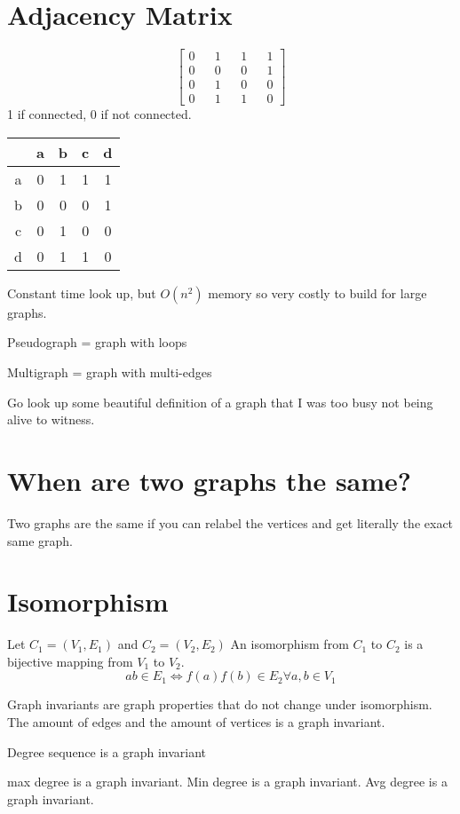 \documentclass{report}
\begin{document}
\section{Adjacency Matrix}
\[
\begin{bmatrix}
0 && 1 && 1 && 1 \\
0 && 0 && 0 && 1 \\
0 && 1 && 0 && 0 \\
0 && 1 && 1 && 0 
\end{bmatrix}
\]
1 if connected, 0 if not connected.

\begin{center}
\begin{tabular}{ c | c | c | c | c }
   & a & b & c & d \\ \hline
a & 0 & 1 & 1 & 1 \\ \hline
b & 0 & 0 & 0 & 1 \\ \hline
c & 0 & 1 & 0 & 0 \\ \hline
d & 0 & 1 & 1 & 0 
\end{tabular}
\end{center}

Constant time look up, but $O(n^2)$ memory so very costly to build for large graphs.


Pseudograph = graph with loops

Multigraph = graph with multi-edges


Go look up some beautiful definition of a graph that I was too busy not being alive to witness.

\section{When are two graphs the same?}
Two graphs are the same if you can relabel the vertices and get literally the exact same graph.


\section{Isomorphism}
Let $C_1 = (V_1, E_1)$ and $C_2 = (V_2, E_2)$ 
An isomorphism from $C_1$ to $C_2$ is a bijective mapping from $V_1$ to $V_2$. 
\[
ab \in E_1 \iff f(a)f(b) \in E_2 \forall a,b \in V_1
\]

Graph invariants are graph properties that do not change under isomorphism. The amount of edges and the amount of vertices is a graph invariant.

Degree sequence is a graph invariant

max degree is a graph invariant. Min degree is a graph invariant. Avg degree is a graph invariant.
\end{document}
